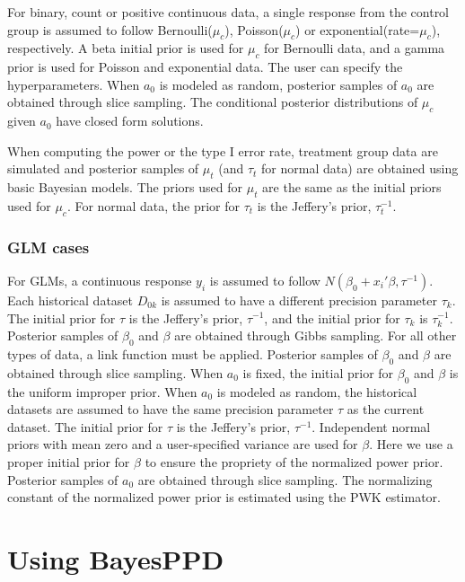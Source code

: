 For binary, count or positive continuous data, a single response from the control group is assumed to follow Bernoulli($\mu_c$), Poisson($\mu_c$) or exponential(rate=$\mu_c$), respectively. A beta initial prior is used for $\mu_c$ for Bernoulli data, and a gamma prior is used for Poisson and exponential data. The user can specify the hyperparameters. When $a_0$ is modeled as random, posterior samples of $a_0$ are obtained through slice sampling. The conditional posterior distributions of $\mu_c$ given $a_0$ have closed form solutions.

When computing the power or the type I error rate, treatment group data are simulated and posterior samples of $\mu_t$ (and $\tau_t$ for normal data) are obtained using basic Bayesian models. The priors used for $\mu_t$ are the same as the initial priors used for $\mu_c$. For normal data, the prior for $\tau_t$ is the Jeffery’s prior, $\tau_t^{-1}$.


\subsubsection*{GLM cases}
For GLMs, a continuous response $y_i$ is assumed to follow $N(\beta_0+x_i'\beta, \tau^{-1})$. Each historical dataset $D_{0k}$ is assumed to have a different precision parameter $\tau_k$. The initial prior for $\tau$ is the Jeffery’s prior, $\tau^{-1}$, and the initial prior for $\tau_k$ is $\tau_k^{-1}$.  Posterior samples of $\beta_0$ and $\beta$ are obtained through Gibbs sampling. For all other types of data, a link function must be applied. Posterior samples of $\beta_0$ and $\beta$ are obtained through slice sampling. When $a_0$ is fixed, the initial prior for $\beta_0$ and $\beta$ is the uniform improper prior. When $a_0$ is modeled as random, the historical datasets are assumed to have the same precision parameter $\tau$ as the current dataset. The initial prior for $\tau$ is the Jeffery’s prior, $\tau^{-1}$. Independent normal priors with mean zero and a user-specified variance are used for $\beta$. Here we use a proper initial prior for $\beta$ to ensure the propriety of the normalized power prior. Posterior samples of $a_0$ are obtained through slice sampling. The normalizing constant of the normalized
power prior is estimated using the PWK estimator.

\section*{Using BayesPPD}\label{sec:use}

